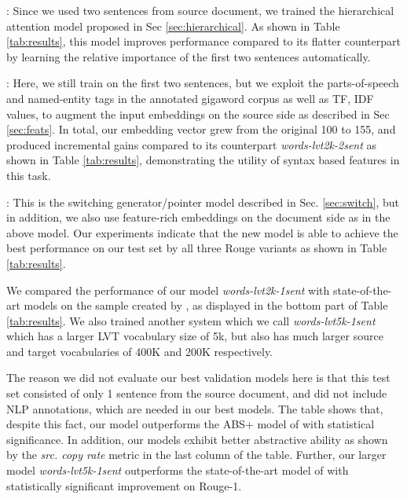 \documentclass[11pt]{article}
\begin{document}
:  Since we used two sentences from source document, we trained the hierarchical attention model proposed in Sec \ref{sec:hierarchical}. As shown in Table \ref{tab:results}, this model improves performance compared to its flatter counterpart by learning the relative importance of the first two sentences automatically. 



:  Here, we still train on the first two sentences, but we exploit the parts-of-speech and named-entity tags in the annotated gigaword corpus as well as TF, IDF values, to augment the input embeddings on the source side as described in Sec \ref{sec:feats}.
In total, our embedding vector grew from the original 100 to 155, and produced incremental gains compared to its counterpart {\it words-lvt2k-2sent} as shown in Table \ref{tab:results}, demonstrating the utility of syntax based features in this task. 




: This is the switching generator/pointer model described in Sec. \ref{sec:switch}, but in addition, we also use feature-rich embeddings on the document side as in the above model.
Our experiments indicate that the new model is able to achieve the best performance on our test set by all three Rouge variants as shown in Table \ref{tab:results}.




We compared the performance of our model {\it words-lvt2k-1sent} with state-of-the-art models on the sample created by , as displayed in the bottom part of Table \ref{tab:results}. We also trained another system which we call {\it words-lvt5k-1sent} which has a larger LVT vocabulary size of 5k, but also has much larger source and target vocabularies of 400K and 200K respectively.

The reason we did not evaluate our best validation models here is that this test set consisted of only 1 sentence from the source document, and did not include NLP annotations, which are needed in our best models. The table shows that, despite this fact, our model outperforms the ABS+ model of  with statistical significance. In addition, our models exhibit better abstractive ability as shown by the {\it src. copy rate} metric in the last column of the table. Further, our larger model {\it words-lvt5k-1sent} outperforms the state-of-the-art model of \cite{chopra} with statistically significant improvement on Rouge-1. 
\end{document}
